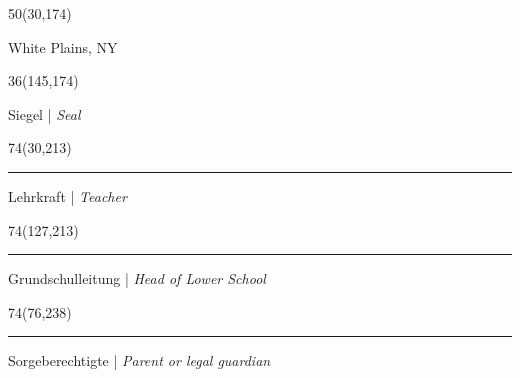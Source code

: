 {%
\begin{textblock}{50}(30,174)

\hspace{29mm}

\vspace{-6mm}

\fontsize{10pt}{12pt}\selectfont
White Plains, NY\hspace{2mm}\raisebox{-1mm}{\rule{44mm}{0.2pt}}
\end{textblock}

\begin{textblock}{36}(145,174)

\centering
\textcolor{lightgraycustom}
{\fontsize{10pt}{12pt}\selectfont
Siegel | \textit{Seal}}



\end{textblock}

\begin{textblock}{74}(30,213)

\vspace{-5mm}

\rule{64mm}{0.4pt}

\centering
{\fontsize{7.5pt}{11pt}\selectfont
Lehrkraft | \textit{Teacher}}
\end{textblock}

\begin{textblock}{74}(127,213)

\vspace{-5mm}

\rule{64mm}{0.4pt}

\centering
{\fontsize{7.5pt}{11pt}\selectfont
Grundschulleitung | \textit{Head of Lower School}}
\end{textblock}

\begin{textblock}{74}(76,238)

\vspace{-5mm}

\rule{64mm}{0.4pt}

\centering
{\fontsize{7.5pt}{11pt}\selectfont
Sorgeberechtigte | \textit{Parent or legal guardian}}
\end{textblock}

\clearpage

\restoregeometry
}

